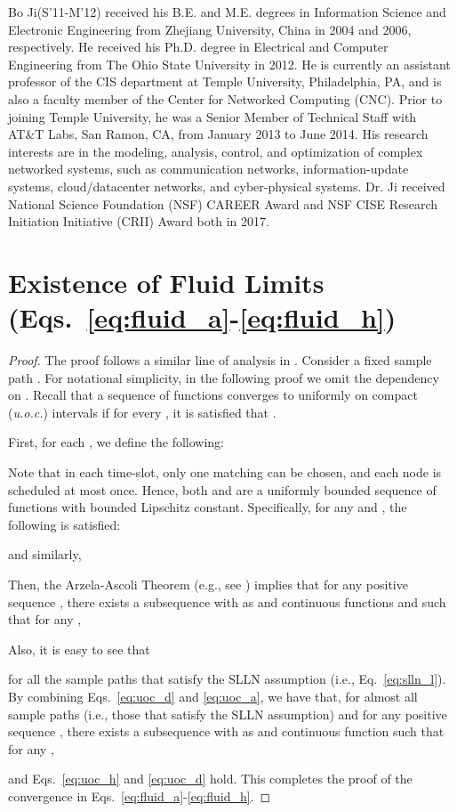 \documentclass[10pt,journal,compsoc]{IEEEtran}
\begin{document}
\begin{IEEEbiography}{Bo Ji}(S'11-M'12)
received his B.E. and M.E. degrees in Information Science and Electronic 
Engineering from Zhejiang University, China in 2004 and 2006, respectively. 
He received his Ph.D. degree in Electrical and Computer Engineering from 
The Ohio State University in 2012. He is currently an assistant professor of 
the CIS department at Temple University, Philadelphia, PA, and is also a 
faculty member of the Center for Networked Computing (CNC). Prior to joining 
Temple University, he was a Senior Member of Technical Staff with AT\&T Labs, 
San Ramon, CA, from January 2013 to June 2014. His research interests are 
in the modeling, analysis, control, and optimization of complex networked systems, 
such as communication networks, information-update systems, cloud/datacenter 
networks, and cyber-physical systems.
Dr. Ji received National Science Foundation (NSF) CAREER Award and 
NSF CISE Research Initiation Initiative (CRII) Award both in 2017.
\end{IEEEbiography}

\clearpage

\appendices

\section{Existence of Fluid Limits (Eqs.~\eqref{eq:fluid_a}-\eqref{eq:fluid_h})} \label{sec:fluid}
\begin{proof}
The proof follows a similar line of analysis in \cite{dai00}. Consider a fixed sample path . 
For notational simplicity, in the following proof we omit the dependency on .
Recall that a sequence of functions  converges to  uniformly 
on compact (\emph{u.o.c.}) intervals if for every , it is satisfied that 
.

First, for each , we define the following:

Note that in each time-slot, only one matching can be chosen, and each node is scheduled at
most once. Hence, both  and  are a uniformly bounded sequence 
of functions with bounded Lipschitz constant. Specifically, for any  and , 
the following is satisfied:

and similarly,

Then, the Arzela-Ascoli Theorem (e.g., see \cite{resnick13}) implies that for any positive sequence , 
there exists a subsequence  with  as  and continuous
functions  and  such that for any ,

Also, it is easy to see that 

for all the sample paths that satisfy the SLLN assumption (i.e., Eq.~\eqref{eq:slln_l}).
By combining Eqs.~\eqref{eq:uoc_d} and \eqref{eq:uoc_a}, we have that, for almost all sample 
paths (i.e., those that satisfy the SLLN assumption) and for any positive sequence , 
there exists a subsequence  with  as 
and continuous function  such that for any , 

and Eqs.~\eqref{eq:uoc_h} and \eqref{eq:uoc_d} hold.
This completes the proof of the convergence in Eqs.~\eqref{eq:fluid_a}-\eqref{eq:fluid_h}.
\end{proof}
\end{document}
